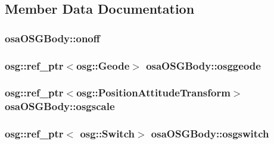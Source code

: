 \subsection{Member Data Documentation}
\hypertarget{classosa_o_s_g_body_a2f491c9c85f3e0d097f342af4e20b9ea}{
\subsubsection[{onoff}]{ osa\-O\-S\-G\-Body\-::onoff\hspace{0.3cm}{\ttfamily [protected]}}}\label{classosa_o_s_g_body_a2f491c9c85f3e0d097f342af4e20b9ea}
\hypertarget{classosa_o_s_g_body_a581c0cb7bfb2f67fa0c95888b1421859}{
\subsubsection[{osggeode}]{\setlength{\rightskip}{0pt plus 5cm}osg\-::ref\-\_\-ptr$<$osg\-::\-Geode$>$ osa\-O\-S\-G\-Body\-::osggeode\hspace{0.3cm}{\ttfamily [protected]}}}\label{classosa_o_s_g_body_a581c0cb7bfb2f67fa0c95888b1421859}
\hypertarget{classosa_o_s_g_body_ac68655b29f93f536143816956b5e1c5d}{
\subsubsection[{osgscale}]{\setlength{\rightskip}{0pt plus 5cm}osg\-::ref\-\_\-ptr$<$osg\-::\-Position\-Attitude\-Transform$>$ osa\-O\-S\-G\-Body\-::osgscale\hspace{0.3cm}{\ttfamily [protected]}}}\label{classosa_o_s_g_body_ac68655b29f93f536143816956b5e1c5d}
\hypertarget{classosa_o_s_g_body_ad40360f7384568a29bdceaee80d0ca23}{
\subsubsection[{osgswitch}]{\setlength{\rightskip}{0pt plus 5cm}osg\-::ref\-\_\-ptr$<$ osg\-::\-Switch$>$ osa\-O\-S\-G\-Body\-::osgswitch\hspace{0.3cm}{\ttfamily [protected]}}}\label{classosa_o_s_g_body_ad40360f7384568a29bdceaee80d0ca23}
